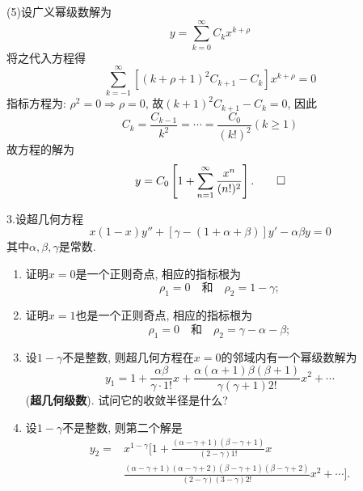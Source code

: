 \begin{solve}
(5)设广义幂级数解为
\[y=\sum_{k=0}^{\infty}C_kx^{k+\rho}\]
将之代入方程得
\[\sum_{k=-1}^{\infty}\left[(k+\rho+1)^2C_{k+1}-C_k\right]x^{k+\rho}=0\]
指标方程为: $\rho^2=0\Rightarrow\rho=0$, 故$(k+1)^2C_{k+1}-C_k=0$, 因此
\[C_k=\frac{C_{k-1}}{k^2}=\cdots=\frac{C_0}{(k!)^2}(k\geq1)\]
故方程的解为
\[y=C_0\left[1+\sum_{n=1}^{\infty}\frac{x^n}{(n!)^2}\right].\qedhere\]
\end{solve}


3.设超几何方程
\[x(1-x)y''+[\gamma-(1+\alpha+\beta)]y'-\alpha\beta y=0\]
其中$\alpha,\beta,\gamma$是常数.
\begin{enumerate}[(1)]
      \item 证明$x=0$是一个正则奇点, 相应的指标根为
            \[\rho_1=0\quad\mbox{和}\quad\rho_2=1-\gamma;\]
      \item 证明$x=1$也是一个正则奇点, 相应的指标根为
            \[\rho_1=0\quad\mbox{和}\quad\rho_2=\gamma-\alpha-\beta;\]
      \item 设$1-\gamma$不是整数, 则超几何方程在$x=0$的邻域内有一个幂级数解为
            \[y_1=1+\frac{\alpha\beta}{\gamma\cdot1!}x+\frac{\alpha(\alpha+1)\beta(\beta+1)}{\gamma(\gamma+1)2!}x^2+\cdots\]
            (\textbf{超几何级数}). 试问它的收敛半径是什么?
      \item 设$1-\gamma$不是整数, 则第二个解是
            \[\begin{split}
            y_2=&x^{1-\gamma}\bigg[1+\frac{(\alpha-\gamma+1)(\beta-\gamma+1)}{(2-\gamma)1!}x\\
            &\frac{(\alpha-\gamma+1)(\alpha-\gamma+2)(\beta-\gamma+1)(\beta-\gamma+2)}{(2-\gamma)(3-\gamma)2!}x^2+\cdots\bigg].
            \end{split}\]
\end{enumerate}


